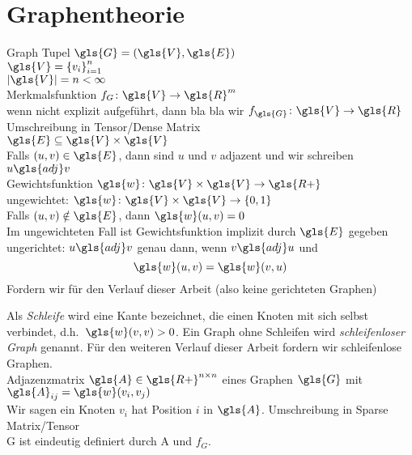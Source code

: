 \section{Graphentheorie}

Graph Tupel $\gls{G} = \left(\gls{V}, \gls{E}\right)$\\
$\gls{V} = {\left\{ v_i \right\}}^n_{i=1}$\\
$\left| \gls{V} \right| = n < \infty$\\
Merkmalsfunktion $f_G \colon \gls{V} \to \gls{R}^m$\\
wenn nicht explizit aufgeführt, dann bla bla wir $f_{\gls{G}} \colon \gls{V} \to \gls{R}$\\
Umschreibung in Tensor/Dense Matrix\\
$\gls{E} \subseteq \gls{V} \times \gls{V}$\\
Falls $\left( u, v \right) \in \gls{E}$, dann sind $u$ und $v$ adjazent und wir schreiben $u \gls{adj} v$\\
Gewichtsfunktion $\gls{w} \colon \gls{V} \times \gls{V} \to \gls{R+}$\\
ungewichtet: $\gls{w} \colon \gls{V} \times \gls{V} \to \left\{ 0, 1 \right\}$\\
Falls $\left( u, v \right) \notin \gls{E}$, dann $\gls{w}\left(u, v\right) = 0$\\
Im ungewichteten Fall ist Gewichtsfunktion implizit durch $\gls{E}$ gegeben\\

ungerichtet:
$u \gls{adj} v$ genau dann, wenn $v \gls{adj} u$ und
\begin{equation}
  \gls{w}\left(u, v\right) = \gls{w}\left(v, u\right)
\end{equation}
Fordern wir für den Verlauf dieser Arbeit (also keine gerichteten Graphen)

Als \emph{Schleife} wird eine Kante bezeichnet, die einen Knoten mit sich selbst verbindet, d.h.\ $\gls{w}\left(v, v\right) > 0$.
Ein Graph ohne Schleifen wird \emph{schleifenloser Graph} genannt.
Für den weiteren Verlauf dieser Arbeit fordern wir schleifenlose Graphen.\\

Adjazenzmatrix $\gls{A} \in \gls{R+}^{n \times n}$ eines Graphen $\gls{G}$ mit $\gls{A}_{ij} = \gls{w}\left(v_i, v_j\right)$\\
Wir sagen ein Knoten $v_i$ hat Position $i$ in $\gls{A}$.
Umschreibung in Sparse Matrix/Tensor\\

\gls{G} ist eindeutig definiert durch \gls{A} und $f_G$.

